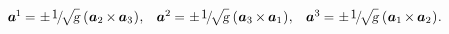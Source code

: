 \begin{otherlanguage}{russian}
\nopagebreak\vspace{-0.1em}\begin{equation*}\scalebox{0.96}[0.96]{$%
\begin{array}{l@{\hspace{.25em}}c@{\hspace{.33em}}r}
\bm{a}^{\hspace{-0.1ex}1} & = & \pm \hspace{.25ex} \displaystyle \nicefrac{\scalebox{0.95}{$1$}}{\hspace{-0.25ex}\sqrt{\hspace{-0.2ex}\scalebox{0.96}{$\mathstrut{\textsl{g}}$}}} \hspace{.2ex} \left( \hspace{.1ex} \bm{a}_2 \hspace{-0.1ex} \times \hspace{-0.1ex} \bm{a}_3 \hspace{.1ex} \right) \hspace{-0.3ex},
\end{array}
\begin{array}{l@{\hspace{.25em}}c@{\hspace{.33em}}r}
\bm{a}^2 & = & \pm \hspace{.25ex} \displaystyle \nicefrac{\scalebox{0.95}{$1$}}{\hspace{-0.25ex}\sqrt{\hspace{-0.2ex}\scalebox{0.96}{$\mathstrut{\textsl{g}}$}}} \hspace{.2ex} \left( \hspace{.1ex} \bm{a}_3 \hspace{-0.1ex} \times \hspace{-0.1ex} \bm{a}_1 \hspace{.1ex} \right) \hspace{-0.3ex},
\end{array}
\begin{array}{l@{\hspace{.25em}}c@{\hspace{.33em}}r}
\bm{a}^3 & = & \pm \hspace{.25ex} \displaystyle \nicefrac{\scalebox{0.95}{$1$}}{\hspace{-0.25ex}\sqrt{\hspace{-0.2ex}\scalebox{0.96}{$\mathstrut{\textsl{g}}$}}} \hspace{.2ex} \left( \hspace{.1ex} \bm{a}_1 \hspace{-0.16ex} \times \hspace{-0.1ex} \bm{a}_2 \hspace{.1ex} \right) \hspace{-0.28ex}.
\end{array}%
$}\end{equation*}


\end{otherlanguage}
